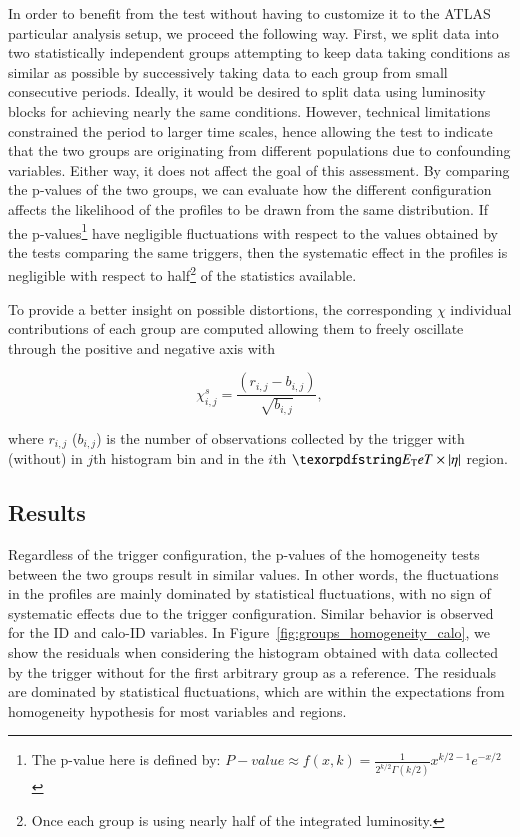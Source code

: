 In order to benefit from the test without having to customize it to the ATLAS particular analysis setup, we proceed the following way. First, we split data into two
statistically independent groups attempting to keep data taking conditions as
similar as possible by successively taking data to each group from small
consecutive periods. Ideally, it would be desired to split data using luminosity
blocks for achieving nearly the same conditions. However, technical limitations
constrained the period to larger time scales, hence allowing the test to
indicate that the two groups are originating from different populations due to
confounding variables. 
Either way, it does not affect the goal of this assessment. By comparing the p-values of the two groups, we can evaluate how the different configuration affects the likelihood of the profiles to be drawn from the same distribution. If the p-values\footnote{The p-value here is defined by: $P-value \approx f(x, k) = \frac{1}{2^{k/2}\Gamma(k/2)}x^{k/2 -1}e^{-x/2}$} have negligible fluctuations with respect to the values obtained by the tests comparing the same triggers, then the systematic effect in the profiles is negligible with respect to half\footnote{Once each group is using nearly half of the integrated luminosity.} of the statistics available.



To provide a better insight on possible distortions, the corresponding $\chi$
individual contributions of each group are computed allowing them to freely
oscillate through the positive and negative axis with

\begin{equation}
  \chi_{i,j}^{s} = \frac{(r_{i,j} - b_{i,j})}{\sqrt{b_{i,j}}},
  \label{eq:signed_chi}
\end{equation}

\noindent where $r_{i,j}$ ($b_{i,j}$) is the number of observations collected by
the trigger with (without) \rnn{} in $j$th histogram bin and in the $i$th
$\et{}\times\abseta{}$ region.


\subsection{Results}\label{top:agreement_homogeneity_results}




Regardless of the trigger configuration, the p-values of the homogeneity tests between the two groups result in similar values. In other words, the fluctuations in the profiles are mainly dominated by statistical fluctuations, with no sign of systematic effects due to the trigger configuration. Similar behavior is observed for the ID and calo-ID variables. In Figure~\ref{fig:groups_homogeneity_calo}, we show the residuals when considering the histogram obtained with data collected by the trigger without \rnn{} for the first arbitrary group as a reference. The residuals are dominated by statistical fluctuations, which are within the expectations from homogeneity hypothesis for most variables and regions.



